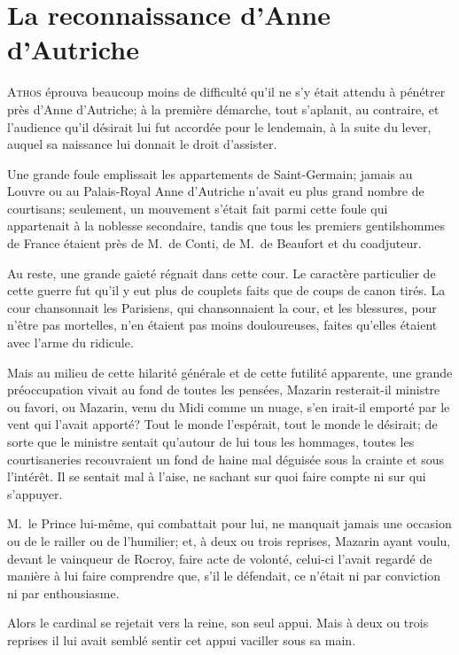 \chapter{La reconnaissance d'Anne d'Autriche}

\lettrine{A}{thos} éprouva beaucoup moins de difficulté qu'il ne s'y était attendu à pénétrer près d'Anne d'Autriche; à la première démarche, tout s'aplanit, au contraire, et l'audience qu'il désirait lui fut accordée pour le lendemain, à la suite du lever, auquel sa naissance lui donnait le droit d'assister.

Une grande foule emplissait les appartements de Saint-Germain; jamais au Louvre ou au Palais-Royal Anne d'Autriche n'avait eu plus grand nombre de courtisans; seulement, un mouvement s'était fait parmi cette foule qui appartenait à la noblesse secondaire, tandis que tous les premiers gentilshommes de France étaient près de M.~de Conti, de M.~de Beaufort et du coadjuteur.

Au reste, une grande gaieté régnait dans cette cour. Le caractère particulier de cette guerre fut qu'il y eut plus de couplets faits que de coups de canon tirés. La cour chansonnait les Parisiens, qui chansonnaient la cour, et les blessures, pour n'être pas mortelles, n'en étaient pas moins douloureuses, faites qu'elles étaient avec l'arme du ridicule.

Mais au milieu de cette hilarité générale et de cette futilité apparente, une grande préoccupation vivait au fond de toutes les pensées, Mazarin resterait-il ministre ou favori, ou Mazarin, venu du Midi comme un nuage, s'en irait-il emporté par le vent qui l'avait apporté? Tout le monde l'espérait, tout le monde le désirait; de sorte que le ministre sentait qu'autour de lui tous les hommages, toutes les courtisaneries recouvraient un fond de haine mal déguisée sous la crainte et sous l'intérêt. Il se sentait mal à l'aise, ne sachant sur quoi faire compte ni sur qui s'appuyer.

M.~le Prince lui-même, qui combattait pour lui, ne manquait jamais une occasion ou de le railler ou de l'humilier; et, à deux ou trois reprises, Mazarin ayant voulu, devant le vainqueur de Rocroy, faire acte de volonté, celui-ci l'avait regardé de manière à lui faire comprendre que, s'il le défendait, ce n'était ni par conviction ni par enthousiasme.

Alors le cardinal se rejetait vers la reine, son seul appui. Mais à deux ou trois reprises il lui avait semblé sentir cet appui vaciller sous sa main.

